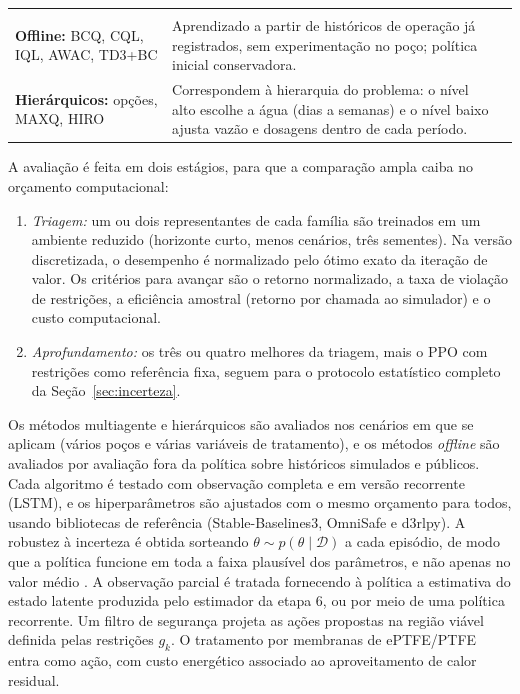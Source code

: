 \documentclass[11pt,a4paper]{article}
\begin{document}
\begin{table}[!htbp]
\begin{tabularx}{\textwidth}{@{}>{\raggedright\arraybackslash}p{}>{\raggedright\arraybackslash}X>{\raggedright\arraybackslash}p{}@{}}
 & \cite{harrold2022,yun2025ro,dcmg2025,qiu2023} \\
\addlinespace
\textbf{Offline:} BCQ, CQL, IQL, AWAC, TD3+BC
 & Aprendizado a partir de históricos de operação já registrados, sem experimentação no poço; política inicial conservadora.
 & \cite{he2025disaiql,nair2020awac} \\
\addlinespace
\textbf{Hierárquicos:} opções, MAXQ, HIRO
 & Correspondem à hierarquia do problema: o nível alto escolhe a água (dias a semanas) e o nível baixo ajusta vazão e dosagens dentro de cada período.
 & \cite{yang2022hrl,engappai2023hrl,wan2025hrl,nachum2018hiro} \\
\bottomrule
\end{tabularx}
\end{table}

A avaliação é feita em dois estágios, para que a comparação ampla caiba no orçamento
computacional:
\begin{enumerate}[label=(\alph*)]
  \item \textit{Triagem:} um ou dois representantes de cada família são treinados em um
        ambiente reduzido (horizonte curto, menos cenários, três sementes). Na versão
        discretizada, o desempenho é normalizado pelo ótimo exato da iteração de valor. Os
        critérios para avançar são o retorno normalizado, a taxa de violação de
        restrições, a eficiência amostral (retorno por chamada ao simulador) e o custo
        computacional.
  \item \textit{Aprofundamento:} os três ou quatro melhores da triagem, mais o PPO com
        restrições como referência fixa, seguem para o protocolo estatístico completo da
        Seção~\ref{sec:incerteza}.
\end{enumerate}
Os métodos multiagente e hierárquicos são avaliados nos cenários em que se aplicam (vários
poços e várias variáveis de tratamento), e os métodos \textit{offline} são avaliados por avaliação
fora da política sobre históricos simulados e públicos. Cada algoritmo é testado com
observação completa e em versão recorrente (LSTM), e os hiperparâmetros são ajustados com o
mesmo orçamento para todos, usando bibliotecas de referência (Stable-Baselines3, OmniSafe e
d3rlpy). A
robustez à incerteza é obtida sorteando $\theta \sim p(\theta\mid\mathcal{D})$ a cada
episódio, de modo que a política funcione em toda a faixa plausível dos parâmetros, e não
apenas no valor médio \cite{nasir2022}. A observação parcial é tratada fornecendo à
política a estimativa do estado latente produzida pelo estimador da etapa 6, ou por meio
de uma política recorrente. Um filtro de segurança projeta as ações propostas na região
viável definida pelas restrições $g_k$. O tratamento por membranas de ePTFE/PTFE entra
como ação, com custo energético associado ao aproveitamento de calor residual.
\end{document}
